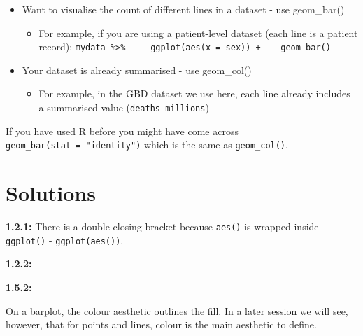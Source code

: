 \documentclass[12pt,]{krantz}
\makeatletter
\newenvironment{Shaded}{\begin{snugshade}}{\end{snugshade}}
\newcommand{\DataTypeTok}[1]{\textcolor[rgb]{0.13,0.29,0.53}{#1}}
\newcommand{\KeywordTok}[1]{\textcolor[rgb]{0.13,0.29,0.53}{\textbf{#1}}}
\newcommand{\NormalTok}[1]{#1}
\newcommand{\OperatorTok}[1]{\textcolor[rgb]{0.81,0.36,0.00}{\textbf{#1}}}
\newcommand{\StringTok}[1]{\textcolor[rgb]{0.31,0.60,0.02}{#1}}
\providecommand{\tightlist}{%
  \setlength{\itemsep}{0pt}\setlength{\parskip}{0pt}}
\newenvironment{kframe}{%
\medskip{}
\setlength{\fboxsep}{.8em}
 \def\at@end@of@kframe{}%
 \ifinner\ifhmode%
  \def\at@end@of@kframe{\end{minipage}}%
  \begin{minipage}{\columnwidth}%
 \fi\fi%
 \def\FrameCommand##1{\hskip\@totalleftmargin \hskip-\fboxsep
 \colorbox{shadecolor}{##1}\hskip-\fboxsep
     \hskip-\linewidth \hskip-\@totalleftmargin \hskip\columnwidth}%
 \MakeFramed {\advance\hsize-\width
   \@totalleftmargin\z@ \linewidth\hsize
   \@setminipage}}%
 {\par\unskip\endMakeFramed%
 \at@end@of@kframe}
\renewenvironment{Shaded}{\begin{kframe}}{\end{kframe}}
\theoremstyle{definition}
\theoremstyle{definition}
\theoremstyle{definition}
\theoremstyle{remark}
\makeatother
\begin{document}
\begin{itemize}
\tightlist
\item
  Want to visualise the count of different lines in a dataset - use
  geom\_bar()

  \begin{itemize}
  \tightlist
  \item
    For example, if you are using a patient-level dataset (each line is
    a patient record):
    \texttt{mydata\ \%\textgreater{}\%\ \ \ \ \ ggplot(aes(x\ =\ sex))\ +\ \ \ \ geom\_bar()}
  \end{itemize}
\item
  Your dataset is already summarised - use geom\_col()

  \begin{itemize}
  \tightlist
  \item
    For example, in the GBD dataset we use here, each line already
    includes a summarised value (\texttt{deaths\_millions})
  \end{itemize}
\end{itemize}

If you have used R before you might have come across
\texttt{geom\_bar(stat\ =\ "identity")} which is the same as
\texttt{geom\_col()}.

\hypertarget{solutions}{%
\section{Solutions}\label{solutions}}

\textbf{1.2.1:} There is a double closing bracket because \texttt{aes()}
is wrapped inside \texttt{ggplot()} - \texttt{ggplot(aes())}.

\textbf{1.2.2:}

\begin{Shaded}
\end{Shaded}

\textbf{1.5.2:}

On a barplot, the colour aesthetic outlines the fill. In a later session
we will see, however, that for points and lines, colour is the main
aesthetic to define.
\end{document}
